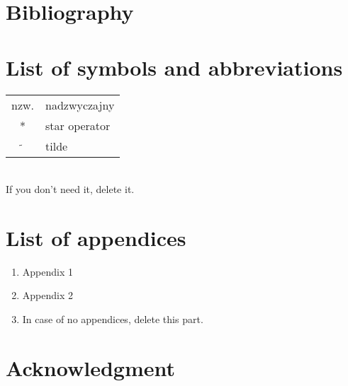 \chapter{Bibliography}


\printbibliography[type=article,heading=subbibliography,title={Articles}]
\printbibliography[type=online,heading=subbibliography,title={Online}]

\chapter*{List of symbols and abbreviations}


\begin{tabular}{cl}
	nzw. & nadzwyczajny \\
	* & star operator \\
	$\widetilde{}$ & tilde 
\end{tabular}
\\
If you don't need it, delete it.
\thispagestyle{empty}

\chapter*{List of appendices}


\begin{enumerate}
	\item Appendix 1
	\item Appendix 2
	\item In case of no appendices, delete this part.
\end{enumerate}
\thispagestyle{empty}

\chapter*{Acknowledgment}

